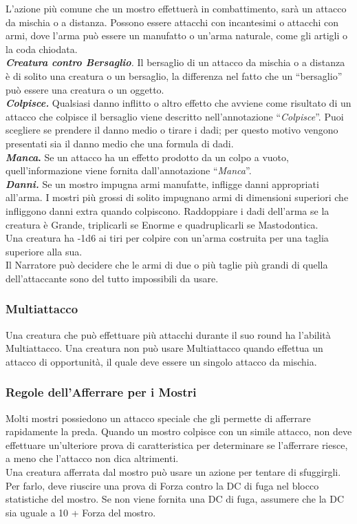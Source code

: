 \begin{multicols}{2}
L'azione più comune che un mostro effettuerà in combattimento, sarà un attacco da mischia o a distanza. Possono essere attacchi con incantesimi o attacchi con armi, dove l'arma può essere un manufatto o un'arma naturale, come gli artigli o la coda chiodata.\\
\emph{\textbf{Creatura contro Bersaglio}.} Il bersaglio di un attacco da mischia o a distanza è di solito una creatura o un bersaglio, la differenza nel fatto che un ``bersaglio'' può essere una creatura o un oggetto.\\
\emph{\textbf{Colpisce.}} Qualsiasi danno inflitto o altro effetto che avviene come risultato di un attacco che colpisce il bersaglio viene descritto nell'annotazione ``\emph{Colpisce}''. Puoi scegliere se prendere il danno medio o tirare i dadi; per questo  motivo vengono presentati sia il danno medio che una formula di dadi. \\
\textbf{\emph{Manca}.} Se un attacco ha un effetto prodotto da un colpo a vuoto, quell'informazione viene fornita dall'annotazione ``\emph{Manca}''.\\
\emph{\textbf{Danni.}} Se un mostro impugna armi manufatte, infligge danni appropriati all'arma. I mostri più grossi di solito impugnano armi di dimensioni superiori che infliggono danni extra quando colpiscono. Raddoppiare i dadi dell'arma se la creatura è Grande, triplicarli se Enorme e quadruplicarli se Mastodontica.\\
Una creatura ha -1d6 ai tiri per colpire con un'arma costruita per una taglia superiore alla sua. \\
Il Narratore può decidere che le armi di due o più taglie più grandi di quella dell'attaccante sono del tutto impossibili da usare.

\subsubsection{Multiattacco}

Una creatura che può effettuare più attacchi durante il suo round ha l'abilità Multiattacco. Una creatura non può usare Multiattacco quando effettua un attacco di opportunità, il quale deve essere un singolo attacco da mischia.

\subsubsection{Regole dell'Afferrare per i Mostri}

Molti mostri possiedono un attacco speciale che gli permette di afferrare rapidamente la preda. Quando un mostro colpisce con un simile attacco, non deve effettuare un'ulteriore prova di caratteristica per determinare se l'afferrare riesce, a meno che l'attacco non dica altrimenti.\\
Una creatura afferrata dal mostro può usare un azione per tentare di sfuggirgli. Per farlo, deve riuscire una prova di Forza contro la DC di fuga nel blocco statistiche del mostro. Se non viene fornita una DC di fuga, assumere che la DC sia uguale a 10 + Forza del mostro.


\end{multicols}
